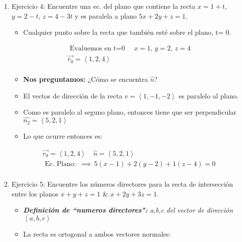 \begin{enumerate}
    \item Ejercicio 4: Encuentre una ec. del plano que contiene  la recta $x=1+t$, $y=2-t$, $z=4-3t$ y es paralela a plano $5x+2y+z=1$.
        \begin{itemize}
            \item Cualquier punto sobre la recta que también esté sobre el plano, t= 0. 
        \end{itemize}
        \begin{center}
            \begin{align*}
                \text{  Evaluemos en t=0  } \quad x=1, \, y=2, \, z=4\\
                \vec{r_0}= \left\langle 1,2,4 \right\rangle  \\ 
            \end{align*}
        \end{center}
        \begin{itemize}
            \item \textbf{Nos preguntamos:} ¿Cómo se encuentra $\hat{n}$?
            \item El vectos de dirección de la recta $v=\left\langle 1,-1,-2 \right\rangle$ es paralelo al plano.
            \item Como es paralelo al seguno plano, entonces tiene que ser perpendicular $\hat{n_2} = \left\langle 5,2,1 \right\rangle$
            \item Lo que ocurre entonces es:
        \end{itemize}
            \begin{center}
                \begin{align*}
                    \vec{r_0} = \left\langle 1,2,4 \right\rangle \quad \hat{n}= \left\langle 5,2,1 \right\rangle \\ 
                    \text{  Ec. Plano:  } \, \implies \, 5(x-1) + 2(y-2)+1(z-4)=0 \\ 
                \end{align*}
            \end{center}
    \item Ejercicio 5: Encuentre los números directores para la recta de intersección entre los planos $x+y+z=1$ \& $x+2y+3z=1$.
            \begin{itemize}
                \item \emph{\textbf{Definición de ``numeros directores":} a,b,c del vector de dirección $\left\langle a,b,c \right\rangle $}
                \item La recta es ortogonal a ambos vectores normales:

\end{itemize}
\end{enumerate}
